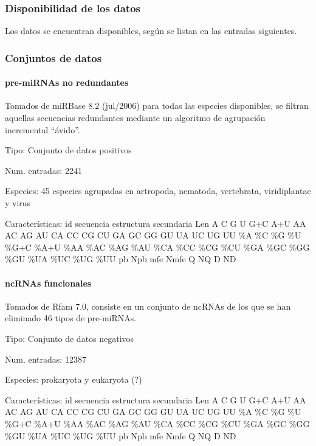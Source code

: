 \documentclass[12pt,bibliography=openstyle,DIV=12,parskip=half-]{scrartcl}
\begin{document}
\subsubsection{Disponibilidad de los datos}
Los datos se encuentran disponibles, según se listan en las entradas
siguientes.
%
\subsubsection{Conjuntos de datos}
\paragraph{pre-miRNAs no redundantes}
Tomados de miRBase 8.2 (jul/2006) para todas las especies disponibles,
se filtran aquellas secuencias redundantes mediante un algoritmo de
agrupación incremental ``ávido''\cite{greedy}.
\begin{description*}
\item[Tipo:] Conjunto de datos positivos
\item[Num. entradas:] 2241
\item[Especies:] 45 especies agrupadas en artropoda, nematoda,
  vertebrata, viridiplantae y virus
\item[Características:] id \quad secuencia \quad estructura secundaria
  \quad Len \quad A \quad C \quad G \quad U \quad G+C \quad A+U \quad
  AA \quad AC \quad AG \quad AU \quad CA \quad CC \quad CG \quad CU
  \quad GA \quad GC \quad GG \quad GU \quad UA \quad UC \quad UG \quad
  UU \quad \%A \quad \%C \quad \%G \quad \%U \quad \%G+C \quad \%A+U
  \quad \%AA \quad \%AC \quad \%AG \quad \%AU \quad \%CA \quad \%CC
  \quad \%CG \quad \%CU \quad \%GA \quad \%GC \quad \%GG \quad \%GU
  \quad \%UA \quad \%UC \quad \%UG \quad \%UU \quad pb \quad Npb \quad
  mfe \quad Nmfe \quad Q \quad NQ \quad D \quad ND \quad
\end{description*}

\paragraph{ncRNAs funcionales}
Tomados de Rfam 7.0, consiste en un conjunto de ncRNAs de los que se
han eliminado 46 tipos de pre-miRNAs.
\begin{description*}
\item[Tipo:] Conjunto de datos negativos
\item[Num. entradas:] 12387
\item[Especies:] prokaryota y eukaryota (?)
\item[Características:] id \quad secuencia \quad estructura secundaria
  \quad Len \quad A \quad C \quad G \quad U \quad G+C \quad A+U \quad
  AA \quad AC \quad AG \quad AU \quad CA \quad CC \quad CG \quad CU
  \quad GA \quad GC \quad GG \quad GU \quad UA \quad UC \quad UG \quad
  UU \quad \%A \quad \%C \quad \%G \quad \%U \quad \%G+C \quad \%A+U
  \quad \%AA \quad \%AC \quad \%AG \quad \%AU \quad \%CA \quad \%CC
  \quad \%CG \quad \%CU \quad \%GA \quad \%GC \quad \%GG \quad \%GU
  \quad \%UA \quad \%UC \quad \%UG \quad \%UU \quad pb \quad Npb \quad
  mfe \quad Nmfe \quad Q \quad NQ \quad D \quad ND \quad
\end{description*}
\end{document}

